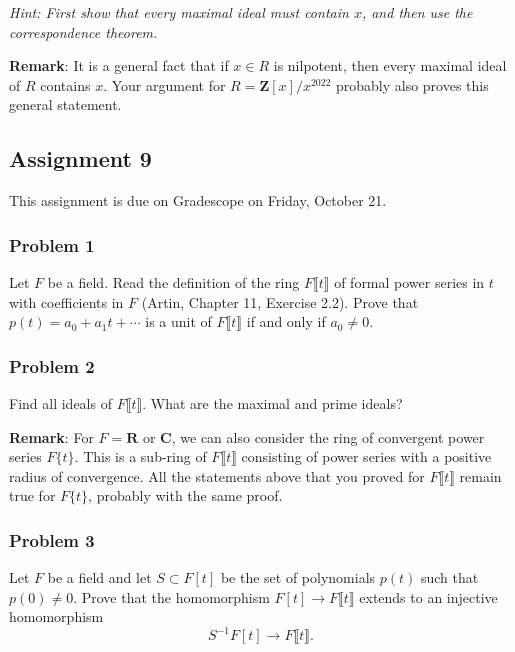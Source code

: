 \documentclass[11pt]{article}
\begin{document}
\emph{Hint: First show that every maximal ideal must contain \(x\), and then use the correspondence theorem.}

\textbf{\textbf{Remark}}:  It is a general fact that if \(x \in R\) is nilpotent, then every maximal ideal of \(R\) contains \(x\).  Your argument for \(R = \mathbf{Z}[x]/x^{2022}\) probably also proves this general statement.

\subsection*{Assignment 9}
\label{sec:org359616a}
This assignment is due on Gradescope on Friday, October 21.
\subsubsection*{Problem 1}
\label{sec:org852ed5f}
Let \(F\) be a field.
Read the definition of the ring \(F\llbracket t \rrbracket\) of formal power series in \(t\) with coefficients in \(F\) (Artin, Chapter 11, Exercise 2.2).
Prove that \(p(t) = a_0 + a_1t + \cdots\) is a unit of \(F\llbracket t \rrbracket\) if and only if \(a_0 \neq 0\).




\subsubsection*{Problem 2}
\label{sec:org1cfba9e}
Find all ideals of \(F\llbracket t \rrbracket\).
What are the maximal and prime ideals?

\textbf{\textbf{Remark}}:
For \(F = \mathbf{R}\) or \(\mathbf{C}\), we can also consider the ring of convergent power series \(F\{ t \}\).
This is a sub-ring of \(F \llbracket t \rrbracket\) consisting of power series with a positive radius of convergence.
All the statements above that you proved for \(F \llbracket t \rrbracket\) remain true for \(F\{ t \}\), probably with the same proof.

\subsubsection*{Problem 3}
\label{sec:org49bbb50}
Let \(F\) be a field and let \(S \subset F[t]\) be the set of polynomials \(p(t)\) such that \(p(0)  \neq 0\).
Prove that the homomorphism \(F[t] \to F\llbracket t \rrbracket\) extends to an injective homomorphism
\[ S^{-1} F[t] \to F\llbracket t \rrbracket.\]
\end{document}
